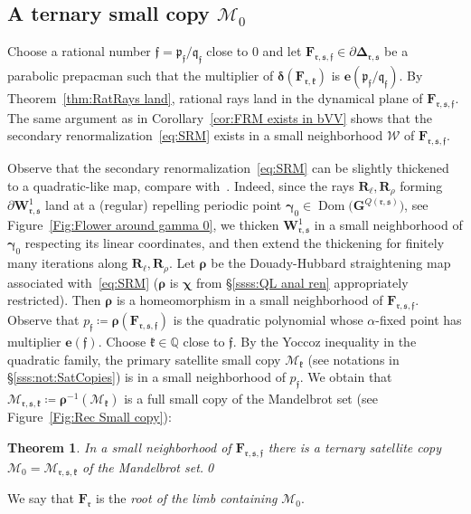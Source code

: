 \documentclass{amsart}
\newcommand{\Dom}{\operatorname {Dom}}
\newcommand{\1}{{\mathbb 1 }}
\newcommand{\Mandel}{{\mathcal{M}}}
\newcommand\MM{\mathscr{M}}
\newcommand\bMM{{\pmb {\MM}}}
\newcommand\HH{\boldsymbol{\Delta}}%
\newcommand{\bF}{{\mathbf F}}
\newcommand{\bW}{{\mathbf W}}
\newcommand{\bR}{{\mathbf R}}
\newcommand{\bG}{{\mathbf G}}
\newcommand{\pp}{\mathfrak{p}}
\newcommand{\ee}{\mathbf e}
\renewcommand{\qq}{\mathfrak{q}}
\newcommand{\ff}{\mathfrak{f}}
\newcommand{\rr}{\mathfrak{r}}
\renewcommand{\ss}{\mathfrak{s}}
\newcommand{\kk}{\mathfrak{k}}
\newcommand\strai{{\boldsymbol \chi}}
\newcommand\bWW{{ \boldsymbol{\mathcal W}}}
\newcommand{\Q}{\mathbb{Q}}
\newtheorem{thm}{Theorem}[section]
\theoremstyle{remark}
\numberwithin{equation}{section}
\theoremstyle{definition}
\newcommand{\bgamma}{{\boldsymbol{ \gamma}}}
\newcommand{\bdelta}{{\boldsymbol{ \delta}}}
\newcommand{\brho}{{\boldsymbol{ \rho}}}
\theoremstyle{nonumberbreak}
\begin{document}
\subsection{A ternary small copy $\bMM_{0}$}
\label{ss: ternary sat copy}
Choose a rational number $\ff=\pp_\ff/\qq_\ff$ close to $0$ and let $\bF_{\rr,\ss,\ff}\in \partial \HH_{\rr,\ss}$ be a parabolic prepacman such that the multiplier of $\bdelta(\bF_{\rr,\kk})$ is $\ee(\pp_\ff/\qq_\ff)$. By Theorem~\ref{thm:RatRays land}, rational rays land in the dynamical plane of $\bF_{\rr,\ss,\ff}$. The same argument as in Corollary~\ref{cor:FRM exists in bVV} shows that the secondary renormalization~\eqref{eq:SRM} exists in a small neighborhood $\bWW$ of $\bF_{\rr,\ss,\ff}$.

Observe that the secondary renormalization~\eqref{eq:SRM} can be slightly thickened to a quadratic-like map, compare with~\cites{DH, Mi}. Indeed, since the rays $\bR_\ell, \bR_\rho$ forming $\partial \bW_{\rr,\ss}^1$ land at a (regular) repelling periodic point $\bgamma_0\in\Dom\big(\bG^{Q(\rr,\ss)}\big)$, see Figure~\ref{Fig:Flower around gamma 0}, we thicken $\bW_{\rr,\ss}^1$ in a small neighborhood of $\bgamma_0$ respecting its linear coordinates, and then extend the thickening for finitely many iterations along $\bR_\ell, \bR_\rho$. Let $\brho$ be the Douady-Hubbard straightening map associated with~\eqref{eq:SRM} ($\brho$ is $\strai$ from \S\ref{ssss:QL anal ren} appropriately restricted). Then $\brho$ is a homeomorphism in a small neighborhood of $\bF_{\rr,\ss,\ff}$. Observe that $p_\ff\coloneqq \brho(\bF_{\rr,\ss,\ff})$ is the quadratic polynomial whose $\alpha$-fixed point has multiplier $\ee(\ff)$. Choose $\kk\in \Q$ close to $\ff$.  By the Yoccoz inequality in the quadratic family, the primary satellite small copy $\Mandel_\kk$ (see notations in \S\ref{sss:not:SatCopies}) is in a small neighborhood of $p_\ff$. We obtain that $\bMM_{\rr,\ss,\kk}\coloneqq \brho^{-1}(\Mandel_\kk)$ is a full small copy of the Mandelbrot set (see Figure~\ref{Fig:Rec Small copy}): 


\begin{thm}
\label{thm:small copy M1}
In a small neighborhood of $\bF_{\rr,\ss,\ff}$ there is a ternary satellite copy $\bMM_0= \bMM_{\rr,\ss,\kk}$ of the Mandelbrot set.\qed
\end{thm}

\noindent We say that $\bF_\rr$ is the \emph{root of the limb containing} $\bMM_0$.
\end{document}
